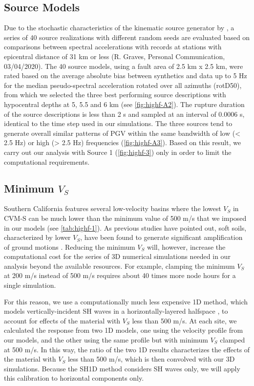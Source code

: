 \subsection{Source Models}
Due to the stochastic characteristics of the kinematic source generator by \citet{gravesKinematicGroundMotion2016}, a series of 40 source realizations with different random seeds are evaluated based on comparisons between spectral accelerations with records at stations with epicentral distance of 31 km or less (R. Graves, Personal Communication, 03/04/2020). The 40 source models, using a fault area of 2.5 km x 2.5 km, were rated based on the average absolute bias between synthetics and data up to 5 Hz for the median pseudo-spectral acceleration rotated over all azimuths (rotD50), from which we selected the three best performing source descriptions with hypocentral depths at 5, 5.5 and 6 km (see \cref{fig:highf-A2}). The rupture duration of the source descriptions is less than 2 s and sampled at an interval of 0.0006 s, identical to the time step used in our simulations. The three sources tend to generate overall similar patterns of PGV within the same bandwidth of low (< 2.5 Hz) or high (> 2.5 Hz) frequencies (\cref{fig:highf-A3}). Based on this result, we carry out our analysis with Source 1 (\cref{fig:highf-3}) only in order to limit the computational requirements.

\subsection{Minimum \textbf{$V_S$}}
Southern California features several low-velocity basins where the lowest $V_S$ in CVM-S can be much lower than the minimum value of 500 m/s that we imposed in our models (see \cref{tab:highf-1}). As previous studies have pointed out, soft soils, characterized by lower $V_S$, have been found to generate significant amplification of ground motions . Reducing the minimum $V_S$ will, however, increase the computational cost for the series of 3D numerical simulations needed in our analysis beyond the available resources. For example, clamping the minimum $V_S$ at 200 m/s instead of 500 m/s requires about 40 times more node hours for a single simulation. 

For this reason, we use a computationally much less expensive 1D method, which models vertically-incident SH waves in a horizontally-layered halfspace , to account for effects of the material with $V_S$ less than 500 m/s. At each site, we calculated the response from two 1D models, one using the velocity profile from our models, and the other using the same profile but with minimum $V_S$ clamped at 500 m/s. In this way, the ratio of the two 1D results characterizes the effects of the material with $V_S$ less than 500 m/s, which is then convolved with our 3D simulations. Because the SH1D method considers SH waves only, we will apply this calibration to horizontal components only. 

